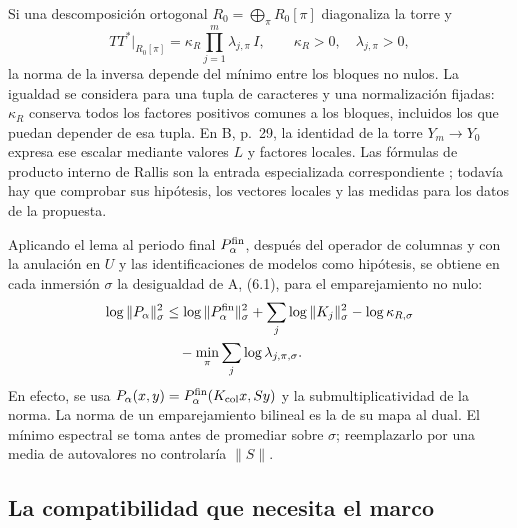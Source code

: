 Si una descomposición ortogonal $R_0=\bigoplus_\pi R_0[\pi]$
diagonaliza la torre y
\begin{equation}
 TT^*|_{R_0[\pi]}=
          \kappa_R\prod_{j=1}^m\lambda_{j,\pi}\,I,
 \qquad \kappa_R>0,\quad\lambda_{j,\pi}>0,
 \label{eq:periodos-espectro}
\end{equation}
la norma de la inversa depende del mínimo entre los bloques no nulos.
La igualdad se considera para una tupla de caracteres y una normalización
fijadas: $\kappa_R$ conserva todos los factores positivos comunes a
los bloques, incluidos los que puedan depender de esa tupla.
En B, p.~29, la identidad de la torre $Y_m\to Y_0$ expresa ese
escalar mediante valores $L$ y factores locales. Las fórmulas de
producto interno de Rallis son la entrada especializada correspondiente
\cite[§11]{gqt-rallis}; todavía hay que comprobar sus hipótesis,
los vectores locales y las medidas para los datos de la propuesta.

Aplicando el lema al periodo final $P_\alpha^{\rm fin}$, después
del operador de columnas y con la anulación en $U$ y las
identificaciones de modelos como hipótesis, se obtiene en cada inmersión $\sigma$
la desigualdad de A, (6.1), para el emparejamiento no nulo:
\begin{align}
 \log\|P_\alpha\|_\sigma^2
 &\le\log\|P_\alpha^{\rm fin}\|_\sigma^2
       +\sum_j\log\|K_j\|_\sigma^2-\log\kappa_{R,\sigma}
       \notag\\
 &\hspace{1em}-\min_\pi\sum_j\log\lambda_{j,\pi,\sigma}.
 \label{eq:periodos-cota-arquimediana}
\end{align}
En efecto, se usa $P_\alpha(x,y)=
P_\alpha^{\rm fin}(K_{\rm col}x,Sy)$ y la submultiplicatividad
de la norma. La norma de un emparejamiento bilineal es la de su mapa
al dual. El mínimo espectral se toma antes de promediar sobre
$\sigma$; reemplazarlo por una media de autovalores no controlaría
$\|S\|$.

\subsection{La compatibilidad que necesita el marco}


